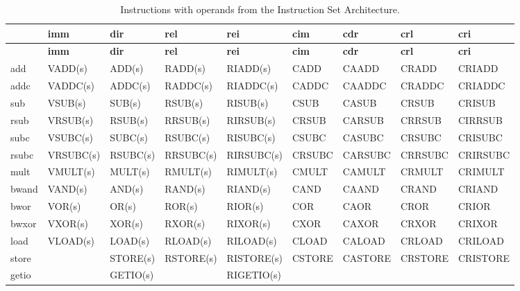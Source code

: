 \begin{table}[H]
\footnotesize
\centering
\begin{longtable}{|l||l|l|l|l|l|l|l|l|}
\caption{Instructions with operands from the Instruction Set Architecture.}
\label{table:isa_instructions} \\
\hline
 & \textbf{imm} & \textbf{dir} & \textbf{rel} & \textbf{rei} & \textbf{cim} & \textbf{cdr} & \textbf{crl} & \textbf{cri} \\
\hline
\endfirsthead
\hline
 & \textbf{imm} & \textbf{dir} & \textbf{rel} & \textbf{rei} & \textbf{cim} & \textbf{cdr} & \textbf{crl} & \textbf{cri} \\
\hline
\endhead
\hline
\endfoot
\hline
\endlastfoot
add       & VADD(s)    & ADD(s)    & RADD(s)    & RIADD(s)    & CADD    & CAADD    & CRADD    & CRIADD    \\ \hline
addc      & VADDC(s)   & ADDC(s)   & RADDC(s)   & RIADDC(s)   & CADDC   & CAADDC   & CRADDC   & CRIADDC   \\ \hline
sub       & VSUB(s)    & SUB(s)    & RSUB(s)    & RISUB(s)    & CSUB    & CASUB    & CRSUB    & CRISUB    \\ \hline
rsub      & VRSUB(s)   & RSUB(s)   & RRSUB(s)   & RIRSUB(s)   & CRSUB   & CARSUB   & CRRSUB   & CIRRSUB   \\ \hline
subc      & VSUBC(s)   & SUBC(s)   & RSUBC(s)   & RISUBC(s)   & CSUBC   & CASUBC   & CRSUBC   & CRISUBC   \\ \hline
rsubc     & VRSUBC(s)  & RSUBC(s)  & RRSUBC(s)  & RIRSUBC(s)  & CRSUBC  & CARSUBC  & CRRSUBC  & CRIRSUBC  \\ \hline
mult      & VMULT(s)   & MULT(s)   & RMULT(s)   & RIMULT(s)   & CMULT   & CAMULT   & CRMULT   & CRIMULT   \\ \hline
bwand     & VAND(s)    & AND(s)    & RAND(s)    & RIAND(s)    & CAND    & CAAND    & CRAND    & CRIAND    \\ \hline
bwor      & VOR(s)     & OR(s)     & ROR(s)     & RIOR(s)     & COR     & CAOR     & CROR     & CRIOR     \\ \hline
bwxor     & VXOR(s)    & XOR(s)    & RXOR(s)    & RIXOR(s)    & CXOR    & CAXOR    & CRXOR    & CRIXOR    \\ \hline
load      & VLOAD(s)   & LOAD(s)   & RLOAD(s)   & RILOAD(s)   & CLOAD   & CALOAD   & CRLOAD   & CRILOAD   \\ \hline
store     &            & STORE(s)  & RSTORE(s)  & RISTORE(s)  & CSTORE  & CASTORE  & CRSTORE  & CRISTORE  \\ \hline
getio     &            & GETIO(s)  &            & RIGETIO(s)  &         &          &          &           \\ \hline

\end{longtable}
\end{table}
